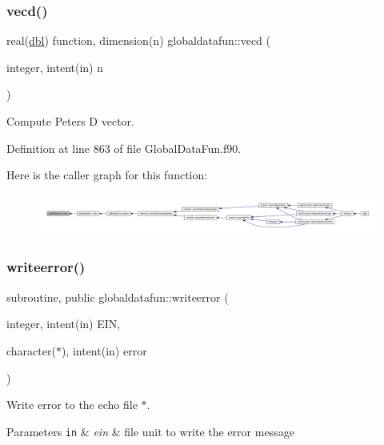 \subsubsection{\texorpdfstring{vecd()}{vecd()}}
{\footnotesize\ttfamily real(\hyperlink{namespaceglobaldatafun_a5008801201dd34f2af8eae07756befb4}{dbl}) function, dimension(n) globaldatafun\+::vecd (\begin{DoxyParamCaption}\item[{integer, intent(in)}]{n }\end{DoxyParamCaption})\hspace{0.3cm}{\ttfamily [private]}}



Compute Peters D vector. 



Definition at line 863 of file Global\+Data\+Fun.\+f90.

Here is the caller graph for this function\+:\nopagebreak
\begin{figure}[H]
\begin{center}
\leavevmode
\includegraphics[width=350pt]{namespaceglobaldatafun_a71653a1d825c3dee70490c228d23b738_icgraph}
\end{center}
\end{figure}
\mbox{\label{namespaceglobaldatafun_ab8bdea863cb470f4098dbfd74bd27faa}} 
\subsubsection{\texorpdfstring{writeerror()}{writeerror()}}
{\footnotesize\ttfamily subroutine, public globaldatafun\+::writeerror (\begin{DoxyParamCaption}\item[{integer, intent(in)}]{E\+IN,  }\item[{character($\ast$), intent(in)}]{error }\end{DoxyParamCaption})}



Write error to the echo file $\ast$. 


\begin{DoxyParams}[1]{Parameters}
\mbox{\tt in}  & {\em ein} & file unit to write the error message \\
\hline
\end{DoxyParams}



